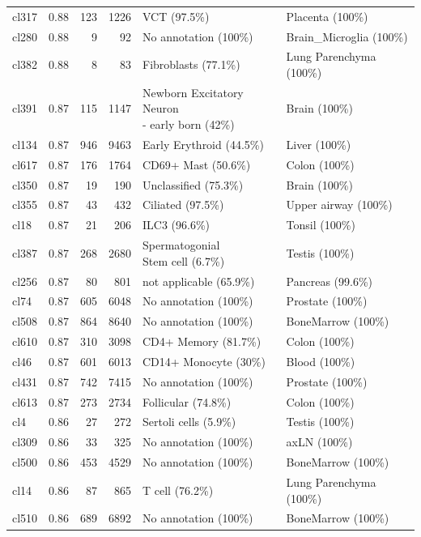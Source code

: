 \begin{table}[ht!]
\begin{tabular}{lrrrll}
  cl317 & 0.88 & 123 & 1226 & VCT (97.5\%) & Placenta (100\%) \\ 
  cl280 & 0.88 &   9 &  92 & No annotation (100\%) & Brain\_Microglia (100\%) \\ 
  cl382 & 0.88 &   8 &  83 & Fibroblasts (77.1\%) & Lung Parenchyma (100\%) \\ 
  cl391 & 0.87 & 115 & 1147 & \specialcell[t]{Newborn Excitatory Neuron\\- early born (42\%)} & Brain (100\%) \\ 
  cl134 & 0.87 & 946 & 9463 & Early Erythroid (44.5\%) & Liver (100\%) \\ 
  cl617 & 0.87 & 176 & 1764 & CD69+ Mast (50.6\%) & Colon (100\%) \\ 
  cl350 & 0.87 &  19 & 190 & Unclassified (75.3\%) & Brain (100\%) \\ 
  cl355 & 0.87 &  43 & 432 & Ciliated (97.5\%) & Upper airway (100\%) \\ 
  cl18 & 0.87 &  21 & 206 & ILC3 (96.6\%) & Tonsil (100\%) \\ 
  cl387 & 0.87 & 268 & 2680 & \specialcell[t]{Spermatogonial\\Stem cell (6.7\%)} & Testis (100\%) \\ 
  cl256 & 0.87 &  80 & 801 & not applicable (65.9\%) & Pancreas (99.6\%) \\ 
  cl74 & 0.87 & 605 & 6048 & No annotation (100\%) & Prostate (100\%) \\ 
  cl508 & 0.87 & 864 & 8640 & No annotation (100\%) & BoneMarrow (100\%) \\ 
  cl610 & 0.87 & 310 & 3098 & CD4+ Memory (81.7\%) & Colon (100\%) \\ 
  cl46 & 0.87 & 601 & 6013 & CD14+ Monocyte (30\%) & Blood (100\%) \\ 
  cl431 & 0.87 & 742 & 7415 & No annotation (100\%) & Prostate (100\%) \\ 
  cl613 & 0.87 & 273 & 2734 & Follicular (74.8\%) & Colon (100\%) \\ 
  cl4 & 0.86 &  27 & 272 & Sertoli cells (5.9\%) & Testis (100\%) \\ 
  cl309 & 0.86 &  33 & 325 & No annotation (100\%) & axLN (100\%) \\ 
  cl500 & 0.86 & 453 & 4529 & No annotation (100\%) & BoneMarrow (100\%) \\ 
  cl14 & 0.86 &  87 & 865 & T cell (76.2\%) & Lung Parenchyma (100\%) \\ 
  cl510 & 0.86 & 689 & 6892 & No annotation (100\%) & BoneMarrow (100\%) \\ 

\end{tabular}
\end{table}
